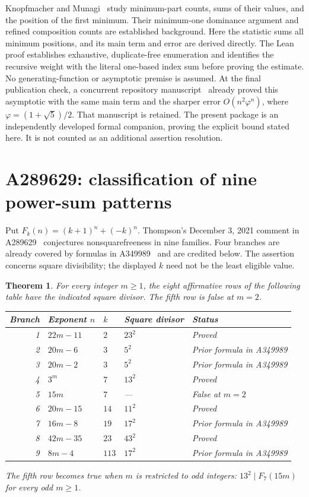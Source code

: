 \documentclass[11pt]{article}
\newtheorem{theorem}{Theorem}[section]
\begin{document}
Knopfmacher and Munagi~\cite{KnopfmacherMunagi} study minimum-part
counts, sums of their values, and the position of the first minimum.
Their minimum-one dominance argument and refined composition counts
are established background. Here the statistic sums all minimum
positions, and its main term and error are derived directly. The Lean
proof establishes exhaustive, duplicate-free enumeration and identifies
the recursive weight with the literal one-based index sum before proving
the estimate. No generating-function or asymptotic premise is assumed.
At the final publication check, a concurrent repository manuscript~\cite{Concurrent}
already proved this asymptotic with the same main term and the sharper error
$O(n^2\varphi^n)$, where $\varphi=(1+\sqrt5)/2$.
That manuscript is retained. The present package is an independently
developed formal companion, proving the explicit bound stated here.
It is not counted as an additional assertion resolution.

\section{A289629: classification of nine power-sum patterns}

Put $F_k(n)=(k+1)^n+(-k)^n$. Thompson's December 3, 2021 comment in
A289629~\cite{A289629} conjectures nonsquarefreeness in nine families.
Four branches are already covered by formulas in A349989~\cite{A349989}
and are credited below. The assertion concerns square divisibility;
the displayed $k$ need not be the least eligible value.

\begin{theorem}\label{thm:power-patterns7}
For every integer $m\ge1$, the eight affirmative rows of the following
table have the indicated square divisor. The fifth row is false at
$m=2$.
\begin{center}
\begin{tabular}{@{}rlll l@{}}
\toprule
Branch & Exponent $n$ & $k$ & Square divisor & Status\\
\midrule
1 & $22m-11$ & $2$ & $23^2$ & Proved\\
2 & $20m-6$ & $3$ & $5^2$ & Prior formula in A349989\\
3 & $20m-2$ & $3$ & $5^2$ & Prior formula in A349989\\
4 & $3^m$ & $7$ & $13^2$ & Proved\\
5 & $15m$ & $7$ & --- & False at $m=2$\\
6 & $20m-15$ & $14$ & $11^2$ & Proved\\
7 & $16m-8$ & $19$ & $17^2$ & Prior formula in A349989\\
8 & $42m-35$ & $23$ & $43^2$ & Proved\\
9 & $8m-4$ & $113$ & $17^2$ & Prior formula in A349989\\
\bottomrule
\end{tabular}
\end{center}
The fifth row becomes true when $m$ is restricted to odd integers:
$13^2\mid F_7(15m)$ for every odd $m\ge1$.
\end{theorem}
\end{document}
